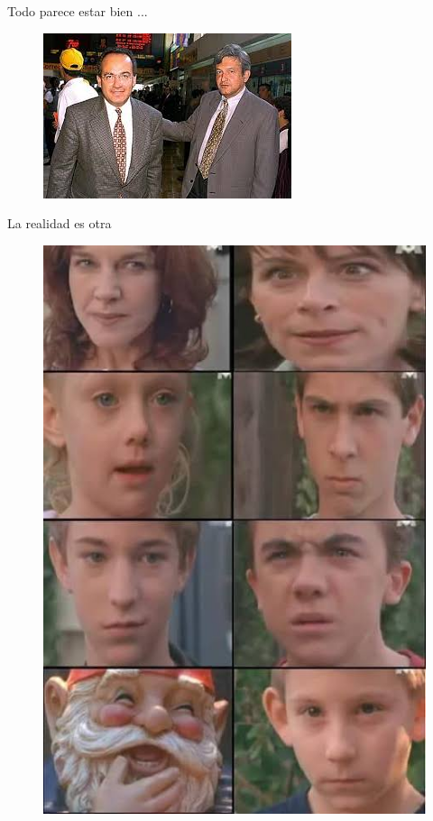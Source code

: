 \documentclass[11pt]{beamer}
\begin{document}
\begin{frame}{Todo parece estar bien ... }
	\begin{figure}
		\includegraphics[scale=0.8]{images/armonia_cuatro	}
	\end{figure}
\end{frame}

\begin{frame}{La realidad es otra}
	\begin{figure}
		\includegraphics[scale=0.3]{images/realidad}
	\end{figure}
\end{frame}
\end{document}
